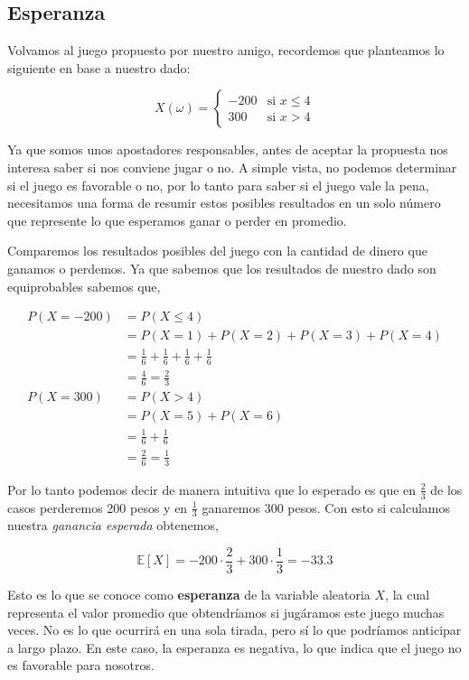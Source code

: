 
\subsection{Esperanza}

Volvamos al juego propuesto por nuestro amigo, recordemos que planteamos lo siguiente en base a nuestro dado:

$$
X(\omega) = \left\{
    \begin{array}{ll}
        -200 & \text{si } x \leq 4 \\
        300 & \text{si } x > 4
    \end{array}
\right.
$$

Ya que somos unos apostadores responsables, antes de aceptar la propuesta nos interesa saber si nos conviene jugar o no.
A simple vista, no podemos determinar si el juego es favorable o no, por lo tanto para saber si el juego vale la pena,
necesitamos una forma de resumir estos posibles resultados en un solo número que represente lo que esperamos ganar o
perder en promedio.

Comparemos los resultados posibles del juego con la cantidad de dinero que ganamos o perdemos.
Ya que sabemos que los resultados de nuestro dado son equiprobables sabemos que,

\begin{align*}
    P(X = -200) &= P(X \leq 4) \\
    &= P(X = 1) + P(X = 2) + P(X = 3) + P(X = 4) \\
    &= \frac{1}{6} + \frac{1}{6} + \frac{1}{6} + \frac{1}{6} \\
    &= \frac{4}{6} = \frac{2}{3} \\
    P(X = 300) &= P(X > 4) \\
    &= P(X = 5) + P(X = 6) \\
    &= \frac{1}{6} + \frac{1}{6}\\
    &= \frac{2}{6} = \frac{1}{3}
\end{align*}

Por lo tanto podemos decir de manera intuitiva que lo esperado es que en $\frac{2}{3}$ de los casos perderemos 200 pesos y en $\frac{1}{3}$
ganaremos 300 pesos. Con esto si calculamos nuestra \textit{ganancia esperada} obtenemos,

$$
\mathbb{E}[X] = -200 \cdot \frac{2}{3} + 300 \cdot \frac{1}{3} = -33.3
$$

Esto es lo que se conoce como \textbf{esperanza} de la variable aleatoria $X$, la cual  representa el valor promedio que
obtendríamos si jugáramos este juego muchas veces. No es lo que ocurrirá en una sola tirada, pero sí lo que podríamos
anticipar a largo plazo. En este caso, la esperanza es negativa, lo que indica que el juego no es favorable para nosotros.

